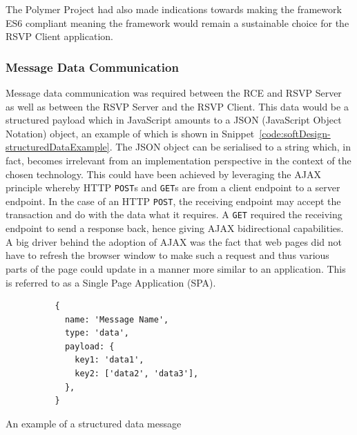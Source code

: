       The Polymer Project had also made indications towards making the framework ES6 compliant meaning the framework would remain a sustainable choice for the RSVP Client application.
      
    \subsubsection{Message Data Communication}
      Message data communication was required between the RCE and RSVP Server as well as between the RSVP Server and the RSVP Client. This data would be a structured payload which in JavaScript amounts to a JSON (JavaScript Object Notation) object, an example of which is shown in Snippet~\ref{code:softDesign-structuredDataExample}. The JSON object can be serialised to a string which, in fact, becomes irrelevant from an implementation perspective in the context of the chosen technology. This could have been achieved by leveraging the AJAX principle whereby HTTP \texttt{POST}s and \texttt{GET}s are from a client endpoint to a server endpoint. In the case of an HTTP \texttt{POST}, the receiving endpoint may accept the transaction and do with the data what it requires. A \texttt{GET} required the receiving endpoint to send a response back, hence giving AJAX bidirectional capabilities. A big driver behind the adoption of AJAX was the fact that web pages did not have to refresh the browser window to make such a request and thus various parts of the page could update in a manner more similar to an application. This is referred to as a Single Page Application (SPA).
      
      \begin{code}
        \begin{verbatim}
          {
            name: 'Message Name',
            type: 'data',
            payload: {
              key1: 'data1',
              key2: ['data2', 'data3'],
            },
          }
        \end{verbatim}
        \caption{An example of a structured data message}
        \label{code:softDesign-structuredDataExample}
      \end{code}
      
